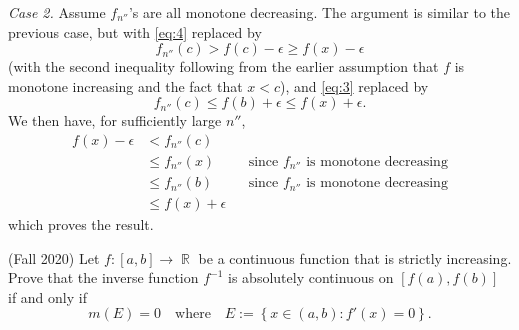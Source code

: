 \documentclass[answers]{exam}
\DeclareMathOperator{\RR}{\mathbb{R}}
\begin{document}
\begin{questions}
\begin{solution}
\textit{Case 2.} Assume $f_{n''}$'s are all monotone decreasing. The argument is
similar to the previous case, but with \eqref{eq:4} replaced by
\begin{equation*}
  f_{n''}(c)>f(c)-\epsilon \geq f(x)-\epsilon
\end{equation*}
(with the second inequality following from the earlier assumption that $f$ is
monotone increasing and the fact that $x<c$), and \eqref{eq:3} replaced by
\begin{equation*}
  f_{n''}(c) \leq f(b) +\epsilon \leq f(x)+ \epsilon.
\end{equation*}
We then have, for sufficiently large $n''$, 
\begin{align*}
  f(x)-\epsilon
  &< f_{n''}(c)\\
  &\leq f_{n''}(x)
  &&\text{since $f_{n''}$ is monotone decreasing}\\
  &\leq f_{n''}(b)
  &&\text{since $f_{n''}$ is monotone decreasing}\\
  &\leq f(x)+\epsilon
\end{align*}
which proves the result.
\end{solution}

\question (Fall 2020) Let $f:[a,b] \to \RR$ be a continuous function that is strictly
increasing. Prove that the inverse function $f^{-1}$ is absolutely continuous on
$[f(a),f(b)]$ if and only if
\begin{equation*}
  m(E) = 0 \quad \text{where} \quad E:= \left\{ x\in (a,b): f'(x)=0 \right\}.
\end{equation*}


\end{questions}
\end{document}
